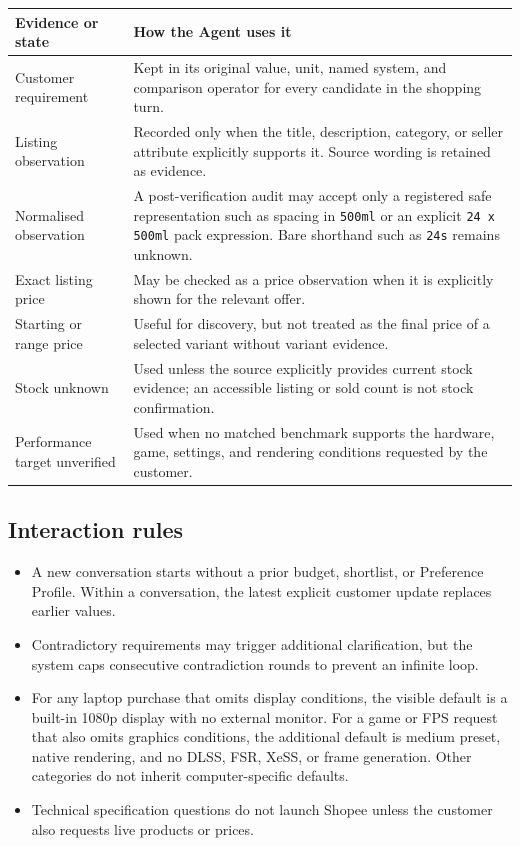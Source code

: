 \documentclass[11pt,letterpaper]{article}
\newcommand{\thead}[1]{\bfseries\centering #1\arraybackslash}
\begin{document}
\begin{tabularx}{\textwidth}{@{}p{1.76in}Y@{}}
\thead{Evidence or state} & \thead{How the Agent uses it} \\
\toprule
Customer requirement & Kept in its original value, unit, named system, and comparison operator for every candidate in the shopping turn. \\
Listing observation & Recorded only when the title, description, category, or seller attribute explicitly supports it. Source wording is retained as evidence. \\
Normalised observation & A post-verification audit may accept only a registered safe representation such as spacing in \texttt{500ml} or an explicit \texttt{24 x 500ml} pack expression. Bare shorthand such as \texttt{24s} remains unknown. \\
Exact listing price & May be checked as a price observation when it is explicitly shown for the relevant offer. \\
Starting or range price & Useful for discovery, but not treated as the final price of a selected variant without variant evidence. \\
Stock unknown & Used unless the source explicitly provides current stock evidence; an accessible listing or sold count is not stock confirmation. \\
Performance target unverified & Used when no matched benchmark supports the hardware, game, settings, and rendering conditions requested by the customer. \\
\bottomrule
\end{tabularx}

\subsection{Interaction rules}
\begin{itemize}
  \item A new conversation starts without a prior budget, shortlist, or Preference Profile. Within a conversation, the latest explicit customer update replaces earlier values.
  \item Contradictory requirements may trigger additional clarification, but the system caps consecutive contradiction rounds to prevent an infinite loop.
  \item For any laptop purchase that omits display conditions, the visible default is a built-in 1080p display with no external monitor. For a game or FPS request that also omits graphics conditions, the additional default is medium preset, native rendering, and no DLSS, FSR, XeSS, or frame generation. Other categories do not inherit computer-specific defaults.
  \item Technical specification questions do not launch Shopee unless the customer also requests live products or prices.
\end{itemize}
\end{document}
